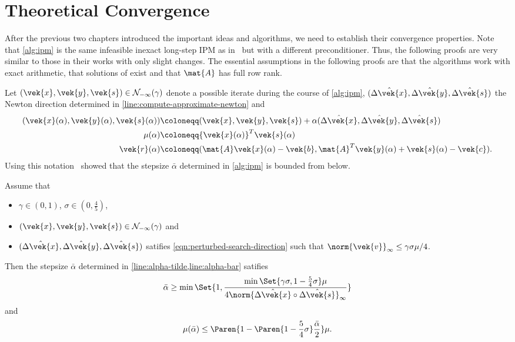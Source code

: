 \chapter{Theoretical Convergence}\label{chap:convergence}

After the previous two chapters introduced the important ideas and algorithms, we need to establish their convergence properties.
Note that \cref{alg:ipm} is the same infeasible inexact long-step IPM as in~\cite{Monteiro-ConvergenceAnalysisLongStepInfeasibleIPMs,Avron-FasterRandomizedInfeasibleIPMs} but with a different preconditioner.
Thus, the following proofs are very similar to those in their works with only slight changes.
The essential assumptions in the following proofs are that the algorithms work with exact arithmetic, that solutions of  exist and that \(\mat{A}\) has full row rank.

Let \((\vek{x}, \vek{y}, \vek{s}) \in \mathcal{N}_{-\infty}(\gamma)\) denote a possible iterate during the course of \cref{alg:ipm}, \((\hat{\Delta\vek{x}}, \hat{\Delta\vek{y}}, \hat{\Delta\vek{s}})\) the Newton direction determined in \cref{line:compute-approximate-newton} and 
\begin{align}
  (\vek{x}(\alpha), \vek{y}(\alpha), \vek{s}(\alpha)) &\coloneqq (\vek{x}, \vek{y}, \vek{s}) + \alpha (\hat{\Delta\vek{x}}, \hat{\Delta\vek{y}}, \hat{\Delta\vek{s}}) \\
  \mu(\alpha) &\coloneqq {\vek{x}(\alpha)}^T \vek{s}(\alpha) \\
  \vek{r}(\alpha) &\coloneqq (\mat{A}\vek{x}(\alpha) - \vek{b}, \mat{A}^T \vek{y}(\alpha) + \vek{s}(\alpha) - \vek{c}).
\end{align}
Using this notation~\textcite{Monteiro-ConvergenceAnalysisLongStepInfeasibleIPMs} showed that the stepsize \(\bar{\alpha}\) determined in \cref{alg:ipm} is bounded from below.

\begin{lemma}\label{thm:alpha-bar-bound}
  Assume that 
  \begin{itemize}
    \item \(\gamma \in (0, 1)\), \(\sigma \in (0, \frac{4}{5})\),
    \item \((\vek{x}, \vek{y}, \vek{s}) \in \mathcal{N}_{-\infty}(\gamma)\) and
    \item \((\hat{\Delta\vek{x}}, \hat{\Delta\vek{y}}, \hat{\Delta\vek{s}})\) satifies \cref{eqn:perturbed-search-direction} such that \(\norm{\vek{v}}_\infty \leq \gamma \sigma \mu / 4\).
  \end{itemize}
  Then the stepsize \(\bar{\alpha}\) determined in \cref{line:alpha-tilde,line:alpha-bar} satifies
  \[ \bar{\alpha} \geq \min \Set{1, \frac{\min \Set{\gamma \sigma, 1 - \frac{5}{4}\sigma} \mu}{4 \norm{\hat{\Delta\vek{x}} \circ \hat{\Delta\vek{s}}}_\infty}} \]
  and
  \[ \mu(\bar{\alpha}) \leq \Paren{1 - \Paren{1 - \frac{5}{4}\sigma} \frac{\bar{\alpha}}{2}} \mu. \]
\end{lemma}

